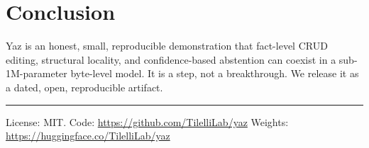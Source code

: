 \documentclass[11pt]{article}
\begin{document}
\section{Conclusion}
Yaz is an honest, small, reproducible demonstration that fact-level CRUD editing, structural locality,
and confidence-based abstention can coexist in a sub-1M-parameter byte-level model. It is a step, not a
breakthrough. We release it as a dated, open, reproducible artifact.

\vspace{1em}
\hrule
\vspace{0.5em}
{\small License: MIT. Code: \url{https://github.com/TilelliLab/yaz} \quad Weights:
\url{https://huggingface.co/TilelliLab/yaz}}
\end{document}
